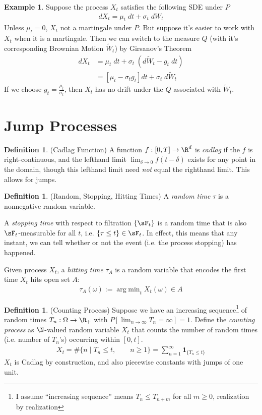 \documentclass[12pt]{article}
\theoremstyle{plain}
\theoremstyle{definition}
\newtheorem{defn}[thm]{Definition}
\newtheorem{ex}[thm]{Example}
\theoremstyle{remark}
\newcommand{\ra}{\rightarrow}
\DeclareMathOperator*{\argmin}{arg\;min}
\newcommand{\sumninf}{\sum^\infty_{n=1}}
\newcommand{\limn}{\lim_{n\rightarrow\infty}}
\begin{document}
\begin{ex}
Suppose the process $X_t$ satisfies the following SDE under $P$
\begin{align*}
  dX_t = \mu_t \;dt + \sigma_t \; dW_t
\end{align*}
Unless $\mu_t=0$, $X_t$ not a martingale under $P$.
But suppose it's easier to work with $X_t$ when it is a martingale.
Then we can switch to the measure $Q$ (with it's corresponding Brownian
Motion $\tilde{W}_t$) by Girsanov's Theorem
\begin{align*}
  dX_t
  &= \mu_t \;dt + \sigma_t \; (d\tilde{W}_t-g_t\;dt)
  \\
  &= [\mu_t -\sigma_t g_t]dt + \sigma_t \; d\tilde{W}_t
\end{align*}
If we choose $g_t=\frac{\mu_t}{\sigma_t}$, then $X_t$ has no drift under
the $Q$ associated with $\tilde{W}_t$.
\end{ex}

\clearpage
\section{Jump Processes}


\begin{defn}(Cadlag Function)
A function $f:[0,T]\ra\R^d$ is \emph{cadlag} if the $f$ is
right-continuous, and the lefthand limit $\lim_{\delta \ra 0}
f(t-\delta)$ exists for any point in the domain, though this lefthand
limit need \emph{not} equal the righthand limit.
This allows for jumps.
\end{defn}
\begin{defn}(Random, Stopping, Hitting Times)
A \emph{random time} $\tau$ is a nonnegative random variable.

A \emph{stopping time} with respect to filtration $\{\sF_t\}$ is a
random time that is also $\sF_t$-measurable for all $t$, i.e.
$\{\tau\leq t\}\in\sF_t$. In effect, this means that any instant, we can
tell whether or not the event (i.e. the process stopping) has happened.

Given process $X_t$, a \emph{hitting time} $\tau_A$ is a random variable
that encodes the first time $X_t$ hits open set $A$:
\begin{align*}
  \tau_A(\omega):=\argmin_{t} X_t(\omega)\in A
\end{align*}
\end{defn}


\begin{defn}(Counting Process)
Suppose we have an increasing sequence\footnote{%
  I assume ``increasing sequence'' means $T_n\leq T_{n+m}$ for all
  $m\geq 0$, realization by realization
}
of random times $T_n:\Omega\ra\R_+$ with
$P[\limn T_n=\infty]=1$.
Define the \emph{counting process} as $\N$-valued random variable $X_t$
that counts the number of random times (i.e. number of $T_n$'s)
occurring within $[0,t]$.
\begin{align*}
  X_t
  =
  \#\{
    n
    \;|\;
    T_n\leq t,
    \qquad n\geq 1
  \}
  =
  \sumninf
  \mathbf{1}_{\{T_n\leq t\}}
\end{align*}
$X_t$ is Cadlag by construction, and also piecewise constants with jumps
of one unit.
\end{defn}
\end{document}

